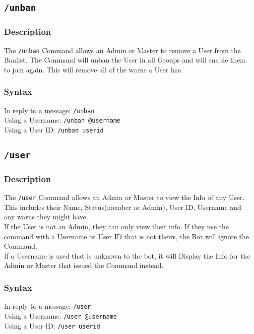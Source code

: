 \documentclass[a4paper]{article}
\begin{document}
    \subsection{\texttt{/unban}}
        \subsubsection*{Description}
            The \texttt{/unban} Command allows an Admin or Master to remove a User from the Banlist. The Command will unban the User in all Groups and will enable them to join again. This will remove all of the warns a User has.

        \subsubsection*{Syntax}
            In reply to a message: \texttt{/unban}\\
            Using a Username: \texttt{/unban @username}\\
            Using a User ID: \texttt{/unban userid}
\newpage

    \subsection{\texttt{/user}}
        \subsubsection*{Description}
            The \texttt{/user} Command allows an Admin or Master to view the Info of any User. This includes their Name, Status(member or Admin), User ID, Username and any warns they might have. \\
            If the User is not an Admin, they can only view their info. If they use the command with a Username or User ID that is not theirs, the Bot will ignore the Command. \\
            If a Username is used that is unknown to the bot, it will Display the Info for the Admin or Master that issued the Command instead.

        \subsubsection*{Syntax}
            In reply to a message: \texttt{/user}\\
            Using a Username: \texttt{/user @username}\\
            Using a User ID: \texttt{/user userid}
\end{document}
